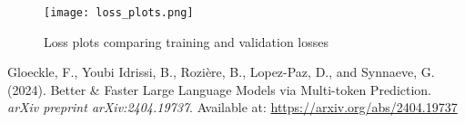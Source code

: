 \documentclass[10pt]{article}
\begin{document}
\begin{figure}[H]
    \centering
    \texttt{[image: loss\_plots.png]}
    \caption{Loss plots comparing training and validation losses}
    \label{fig:loss_plots}
\end{figure}


\begin{thebibliography}{1}

Gloeckle, F., Youbi Idrissi, B., Rozière, B., Lopez-Paz, D., and Synnaeve, G. (2024).
\newblock Better \& Faster Large Language Models via Multi-token Prediction.
\newblock \textit{arXiv preprint arXiv:2404.19737}. Available at: \url{https://arxiv.org/abs/2404.19737}

\end{thebibliography}
\end{document}
